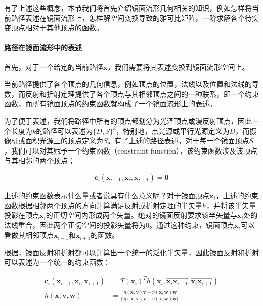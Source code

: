 有了上述这些概念，本节我们将首先介绍镜面流形几何相关的知识，例如怎样将当前路径表述在镜面流形上，怎样解空间变换导致的雅可比矩阵，一阶求解各个待突变顶点相对于其他顶点的函数。




\paragraph{路径在镜面流形中的表述}
首先，对于一个给定的当前路径${\mathbf{x}}$，我们需要将其表述变换到镜面流形空间上。

当前路径提供了各个顶点的几何信息，例如顶点的位置，法线以及位置和法线的导数，而反射和折射定理提供了各个顶点与其相邻顶点之间的一种联系，即一个约束函数，而所有镜面顶点的约束函数就构成了一个镜面流形上的表述。

为了便于表述，我们将路径中所有的顶点都划分为光泽顶点或漫反射顶点，因此一个长度为$k$的路径可以表述为$\{D,S\}^{k}$，特别地，点光源或平行光源定义为$D$，而摄像机或面积光源上的顶点定义为$S$。有了上述的路径表述，对于每一个镜面顶点$S$，我们可以对其赋予一个约束函数（constraint function），该约束函数涉及该顶点与其相邻的两个顶点；

\begin{equation}\label{e:mlt-constraint-function}
	\mathbf{c}_i(\mathbf{x}_{i-1},\mathbf{x}_i,\mathbf{x}_{i+1})=\mathbf{0}
\end{equation}

上述的约束函数表示什么量或者说具有什么意义呢？对于镜面顶点$\mathbf{x}_i$，上述的约束函数根据相邻两个顶点的方向计算满足反射或折射定理的半矢量$h$，并将该半矢量投影在顶点$\mathbf{x}_i$的正切空间内形成两个矢量。绝对的镜面反射要求该半矢量与$\mathbf{x}_i$处的法线重合，因此两个正切空间的投影矢量将为$0$。通过这种约束，镜面顶点$\mathbf{x}_i$可以看做其相邻顶点$\mathbf{x}_{i-1}$和$\mathbf{x}_{i+1}$的函数。

根据\cite{a:Microfacetmodelsforrefractionthroughroughsurfaces}，镜面反射和折射都可以计算出一个统一的泛化半矢量，因此镜面反射和折射可以表述为一个统一的约束函数：

\begin{equation}\label{e:mlt-constraint-function-and-half-vector}
\begin{aligned}
	\mathbf{c}_i(\mathbf{x}_{i-1},\mathbf{x}_i,\mathbf{x}_{i+1})&=T(\mathbf{x}_i)^{T}h(\mathbf{x}_i,\overrightarrow{\mathbf{x}_i\mathbf{x}_{i-1}},\overrightarrow{\mathbf{x}_i\mathbf{x}_{i+1}})\\
	h(\mathbf{x},\mathbf{v},\mathbf{w})&=\frac{\eta(\mathbf{x},\mathbf{v})\mathbf{v}+\eta(\mathbf{x},\mathbf{w})\mathbf{w}}{||\eta(\mathbf{x},\mathbf{v})\mathbf{v}+\eta(\mathbf{x},\mathbf{w})\mathbf{w}||}
\end{aligned}
\end{equation}

